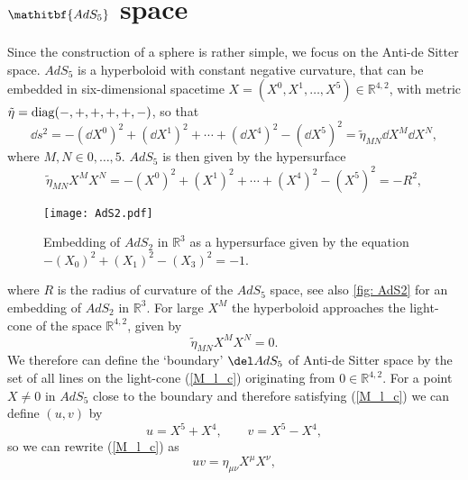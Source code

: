 \section[$\mathrm{AdS_{5}}$ space]{$\mathitbf{AdS_{5}}$ space}\label{AdS5}
Since the construction of a sphere is rather simple, we focus on the Anti-de Sitter space. $AdS_{5}$ is a hyperboloid with constant negative curvature, that can be embedded in six-dimensional  spacetime $X = (X^{0},X^{1},\ldots,X^{5}) \in \mathbb{R}^{4,2}$, with metric ${\tilde{\eta} = {\rm diag}(-,+,+,+,+,-)}$, so that
\begin{equation}
\dd s^{2} = -\left(\dd X^{0}\right)^{2} + \left(\dd X^{1}\right)^{2} + \cdots + \left(\dd X^{4}\right)^{2} - \left(\dd X^{5}\right)^{2} = \tilde{\eta}_{MN} \dd X^{M}\dd X^{N},
\end{equation}
where $M,N \in {0,\ldots,5}$. $AdS_{5}$ is then given by the hypersurface
\begin{equation}
\tilde{\eta}_{MN}X^{M}X^{N} = -\left(X^{0}\right)^{2} + \left(X^{1}\right)^{2} + \cdots + \left(X^{4}\right)^{2} - \left(X^{5}\right)^{2} = -R^{2},
\label{hyperbol}
\end{equation}
%
%
\begin{figure}[ht!]
\begin{center}
\texttt{[image: AdS2.pdf]}
\caption{Embedding of $AdS_{2}$ in $\mathbb{R}^{3}$ as a hypersurface given by the equation $-(X_{0})^{2}+(X_{1})^{2}-(X_{3})^{2}=-1$. \label{fig: AdS2}}
\end{center}
\end{figure}
%
%
where $R$ is the radius of curvature of the $AdS_{5}$ space, see also \autoref{fig: AdS2}  for an embedding of $AdS_{2}$ in $\mathbb{R}^{3}$. For large $X^{M}$ the hyperboloid approaches the light-cone of the  space $\mathbb{R}^{4,2}$, given by
\begin{equation}
\tilde{\eta}_{MN}X^{M}X^{N} = 0.
\label{M_l_c}
\end{equation}
We therefore can define the `boundary' $\del AdS_{5}$ of Anti-de Sitter space by the set of all lines on the light-cone (\ref{M_l_c}) originating from $0 \in \mathbb{R}^{4,2}$. For a point $X \neq 0$ in $AdS_{5}$ close to the boundary and therefore satisfying (\ref{M_l_c}) we can define $(u,v)$ by
\begin{equation}
u = X^{5}+X^{4}, \qquad v = X^{5}-X^{4},
\end{equation}
so we can rewrite (\ref{M_l_c}) as
\begin{equation}
uv = \eta_{\mu \nu} X^{\mu}X^{\nu},
\end{equation}
